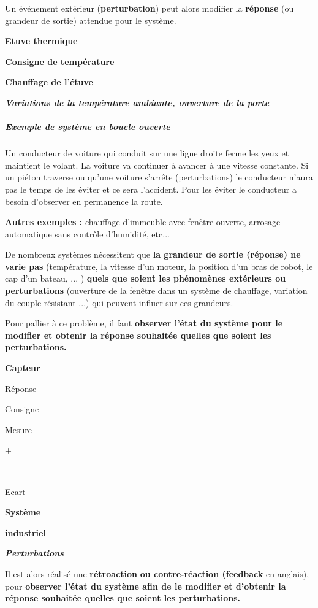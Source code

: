 Un événement extérieur (\textbf{perturbation}) peut alors modifier la
\textbf{réponse} (ou grandeur de sortie) attendue pour le système.

\textbf{Etuve thermique}

\textbf{Consigne de température}

\textbf{Chauffage de l'étuve}

\emph{\textbf{Variations de la température ambiante, ouverture de la
porte}}

\subparagraph*{Exemple de système en boucle ouverte }\label{exemple-de-systuxe8me-en-boucle-ouverte}

Un conducteur de voiture qui conduit sur une ligne droite ferme les yeux
et maintient le volant. La voiture va continuer à avancer à une vitesse
constante. Si un piéton traverse ou qu'une voiture s'arrête
(perturbations) le conducteur n'aura pas le temps de les éviter et ce
sera l'accident. Pour les éviter le conducteur a besoin d'observer en
permanence la route.

\textbf{Autres exemples :} chauffage d'immeuble avec fenêtre ouverte,
arrosage automatique sans contrôle d'humidité, etc...

De nombreux systèmes nécessitent que \textbf{la grandeur de sortie
(réponse) ne varie pas} (température, la vitesse d'un moteur, la
position d'un bras de robot, le cap d'un bateau, ... ) \textbf{quels que
soient les phénomènes extérieurs ou perturbations} (ouverture de la
fenêtre dans un système de chauffage, variation du couple résistant ...)
qui peuvent influer sur ces grandeurs.

Pour pallier à ce problème, il faut \textbf{observer l'état du système
pour le modifier et obtenir la réponse souhaitée quelles que soient les
perturbations.}

\textbf{Capteur}

Réponse

Consigne

Mesure

+

-

Ecart

\textbf{Système}

\textbf{industriel}

\emph{\textbf{Perturbations}}

Il est alors réalisé une \textbf{rétroaction} \textbf{ou contre-réaction
(feedback} en anglais), pour \textbf{observer l'état du système afin de
le modifier et d'obtenir la réponse souhaitée quelles que soient les
perturbations.}

